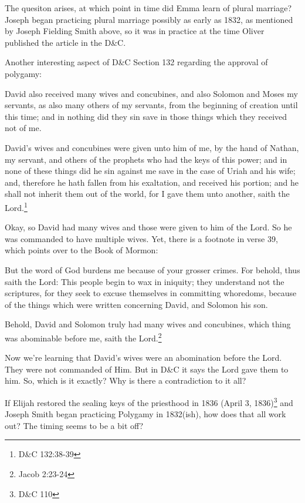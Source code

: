 The quesiton arises, at which point in time did Emma learn of plural marriage? 
Joseph began practicing plural marriage possibly as early as 1832, as mentioned by
Joseph Fielding Smith above, so it was in practice at the time Oliver published the
article in the D\&C.

Another interesting aspect of D\&C Section 132 regarding the approval of polygamy:

\begin{displayquote}
David also received many wives and concubines, and also Solomon and Moses my 
servants, as also many others of my servants, from the beginning of creation until 
this time; and in nothing did they sin save in those things which they received 
not of me.

David's wives and concubines were given unto him of me, by the hand of Nathan, 
my servant, and others of the prophets who had the keys of this power; and in none of 
these things did he sin against me save in the case of Uriah and his wife; and, 
therefore he hath fallen from his exaltation, and received his portion; and he 
shall not inherit them out of the world, for I gave them unto another, saith the 
Lord.\footnote{D\&C 132:38-39}
\end{displayquote}

Okay, so David had many wives and those were given to him of the Lord. So he was
commanded to have multiple wives. Yet, there is a footnote in verse 39, which points
over to the Book of Mormon:

\begin{displayquote}
But the word of God burdens me because of your grosser crimes. For behold, 
thus saith the Lord: This people begin to wax in iniquity; they understand not the 
scriptures, for they seek to excuse themselves in committing whoredoms, because of 
the things which were written concerning David, and Solomon his son.

Behold, David and Solomon truly had many wives and concubines, which thing was 
abominable before me, saith the Lord.\footnote{Jacob 2:23-24}
\end{displayquote}

Now we're learning that David's wives were an abomination before the Lord. They were
not commanded of Him. But in D\&C it says the Lord gave them to him. So, which is it
exactly? Why is there a contradiction to it all?

If Elijah restored the sealing keys of the priesthood in 1836 (April 3,
  1836)\footnote{D\&C 110} and Joseph Smith began practicing Polygamy in 1832(ish),
  how does that all work out? The timing seems to be a bit off?

